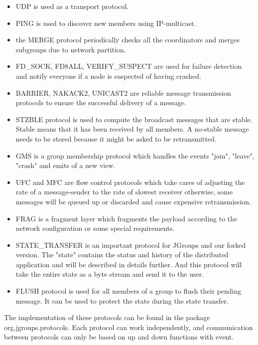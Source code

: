 \documentclass[a4paper,10pt]{report}
\begin{document}
\begin{itemize}
\item UDP is used as a transport protocol.
\item PING is used to discover new members using IP-multicast.
\item the MERGE protocol periodically checks all the coordinators and merges subgroups due to network partition.
\item FD\_SOCK, FD8ALL, VERIFY\_SUSPECT are used for failure detection and notify everyone if a node is suspected of having crashed.
\item BARRIER, NAKACK2, UNICAST2 are reliable message transmission protocols to ensure the successful delivery of a message.
\item STZBLE protocol is used to compute the broadcast messages that are stable. Stable means that it has been received by all members. A no-stable message needs to be stored because it might be asked to be retransmitted.
\item GMS is a group membership protocol which handles the  events "join", "leave", "crash" and emits of a new view.
\item UFC and MFC are flow control protocols which take cares of adjusting the rate of a message-sender to the rate of slowest receiver otherwise, some messages will be queued up or discarded and cause expensive retransmission.
\item FRAG is a fragment layer which fragments the payload according to the network configuration or some special requirements.
\item STATE\_TRANSFER is an important protocol for JGroups and our forked version. The "state" contains the status and history of the distributed application and will be described in details further. And this protocol will take the entire state as a byte stream and send it to the user.
\item FLUSH protocol is used for all members of a group to flush their pending message. It can be used to protect the state during the state transfer.
\end{itemize}
The implementation of these protocols can be found in the package org.jgroups.protocols. Each protocol can work independently, and communication between protocols can only be based on up and down functions with event.
\end{document}
